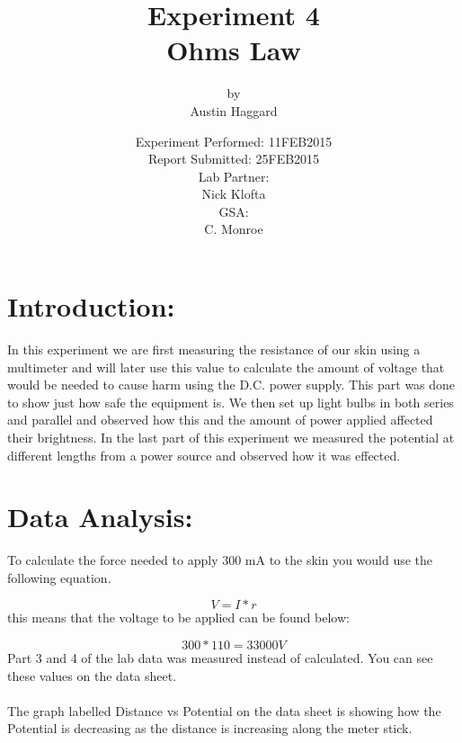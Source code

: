 \documentclass{article}
\title{Experiment 4 \\ Ohms Law}
\author{by \\ Austin Haggard}
\date{
	Experiment Performed: 11FEB2015 \\
	Report Submitted: 25FEB2015\\[11pt]
	Lab Partner: \\ Nick Klofta \\[11pt] 
	GSA: \\ C. Monroe
}
\begin{document}
\maketitle
\thispagestyle{empty}
\newpage

\section*{Introduction:}
\setcounter{page}{1}
In this experiment we are first measuring the resistance of our skin using a multimeter and will later use this value to calculate the amount of voltage that would be needed to cause harm using the D.C. power supply.  This part was done to show just how safe the equipment is.  We then set up light bulbs in both series and parallel and observed how this and the amount of power applied affected their brightness.  In the last part of this experiment we measured the potential at different lengths from a power source and observed how it was effected.
\newpage


\section*{Data Analysis:}
\setcounter{page}{3}
To calculate the force needed to apply 300 mA to the skin you would use the following equation.

\[V = I*r\]
this means that the voltage to be applied can be found below:

\[300 * 110 = 33000 V\]
Part 3 and 4 of the lab data was measured instead of calculated.  You can see these values on the data sheet. \\ \\
The graph labelled Distance vs Potential on the data sheet is showing how the Potential is decreasing as the distance is increasing along the meter stick.
\newpage
\end{document}
